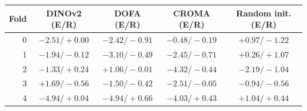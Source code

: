 \begin{tabular}{rcccc}
\hline
Fold & DINOv2 (E/R) & DOFA (E/R) & CROMA (E/R) & Random init. (E/R) \\
\hline
0 & $-2.51 / +0.00$ & $-2.42 / -0.91$ & $-0.48 / -0.19$ & $+0.97 / -1.22$ \\
1 & $-1.94 / -0.12$ & $-3.10 / -0.49$ & $-2.45 / -0.71$ & $+0.26 / +1.07$ \\
2 & $-1.33 / +0.24$ & $+1.06 / -0.01$ & $-4.32 / -0.44$ & $-2.19 / -1.04$ \\
3 & $+1.69 / -0.56$ & $-1.50 / -0.42$ & $-2.51 / -0.05$ & $-0.94 / -0.56$ \\
4 & $-4.94 / +0.04$ & $-4.94 / +0.66$ & $-4.03 / +0.43$ & $+1.04 / +0.44$ \\
\hline
\end{tabular}
